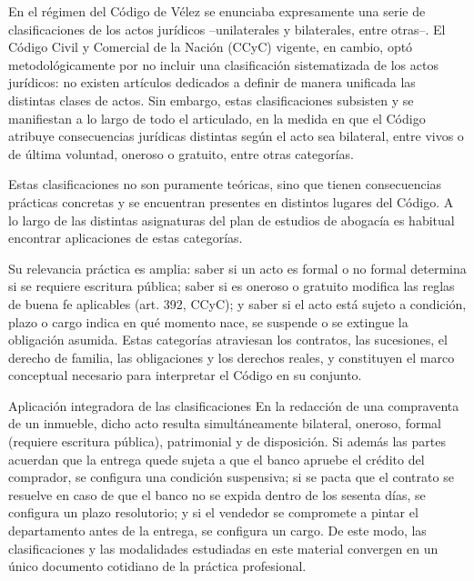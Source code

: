 \documentclass[12pt,oneside]{book}
\begin{document}
En el régimen del Código de Vélez se enunciaba expresamente una serie de clasificaciones de los actos jurídicos --unilaterales y bilaterales, entre otras--. El Código Civil y Comercial de la Nación (CCyC) vigente, en cambio, optó metodológicamente por no incluir una clasificación sistematizada de los actos jurídicos: no existen artículos dedicados a definir de manera unificada las distintas clases de actos. Sin embargo, estas clasificaciones subsisten y se manifiestan a lo largo de todo el articulado, en la medida en que el Código atribuye consecuencias jurídicas distintas según el acto sea bilateral, entre vivos o de última voluntad, oneroso o gratuito, entre otras categorías.

\begin{note}
Estas clasificaciones no son puramente teóricas, sino que tienen consecuencias prácticas concretas y se encuentran presentes en distintos lugares del Código. A lo largo de las distintas asignaturas del plan de estudios de abogacía es habitual encontrar aplicaciones de estas categorías.
\end{note}

Su relevancia práctica es amplia: saber si un acto es formal o no formal determina si se requiere escritura pública; saber si es oneroso o gratuito modifica las reglas de buena fe aplicables (art. 392, CCyC); y saber si el acto está sujeto a condición, plazo o cargo indica en qué momento nace, se suspende o se extingue la obligación asumida. Estas categorías atraviesan los contratos, las sucesiones, el derecho de familia, las obligaciones y los derechos reales, y constituyen el marco conceptual necesario para interpretar el Código en su conjunto.

\begin{example}{Aplicación integradora de las clasificaciones}
En la redacción de una compraventa de un inmueble, dicho acto resulta simultáneamente bilateral, oneroso, formal (requiere escritura pública), patrimonial y de disposición. Si además las partes acuerdan que la entrega quede sujeta a que el banco apruebe el crédito del comprador, se configura una condición suspensiva; si se pacta que el contrato se resuelve en caso de que el banco no se expida dentro de los sesenta días, se configura un plazo resolutorio; y si el vendedor se compromete a pintar el departamento antes de la entrega, se configura un cargo. De este modo, las clasificaciones y las modalidades estudiadas en este material convergen en un único documento cotidiano de la práctica profesional.
\end{example}
\end{document}
